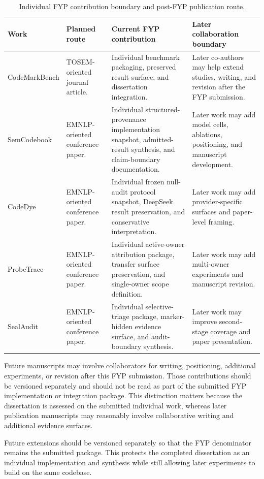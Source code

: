 \begin{table}[htbp]
\centering
\caption{Individual FYP contribution boundary and post-FYP publication route.}
\label{tab:individual-publication-route}
\tighttable
\begin{tabularx}{\textwidth}{@{}L{2.55cm}L{2.10cm}YY@{}}
\toprule
Work & Planned route & Current FYP contribution & Later collaboration boundary \\
\midrule
CodeMarkBench & TOSEM-oriented journal article. & Individual benchmark packaging, preserved result surface, and dissertation integration. & Later co-authors may help extend studies, writing, and revision after the FYP submission. \\
SemCodebook & EMNLP-oriented conference paper. & Individual structured-provenance implementation snapshot, admitted-result synthesis, and claim-boundary documentation. & Later work may add model cells, ablations, positioning, and manuscript development. \\
CodeDye & EMNLP-oriented conference paper. & Individual frozen null-audit protocol snapshot, DeepSeek result preservation, and conservative interpretation. & Later work may add provider-specific surfaces and paper-level framing. \\
ProbeTrace & EMNLP-oriented conference paper. & Individual active-owner attribution package, transfer surface preservation, and single-owner scope definition. & Later work may add multi-owner experiments and manuscript revision. \\
SealAudit & EMNLP-oriented conference paper. & Individual selective-triage package, marker-hidden evidence surface, and audit-boundary synthesis. & Later work may improve second-stage coverage and paper presentation. \\
\bottomrule
\end{tabularx}
\end{table}

Future manuscripts may involve collaborators for writing, positioning, additional experiments, or revision after this FYP submission. Those contributions should be versioned separately and should not be read as part of the submitted FYP implementation or integration package. This distinction matters because the dissertation is assessed on the submitted individual work, whereas later publication manuscripts may reasonably involve collaborative writing and additional evidence surfaces.

Future extensions should be versioned separately so that the FYP denominator remains the submitted package. This protects the completed dissertation as an individual implementation and synthesis while still allowing later experiments to build on the same codebase.

